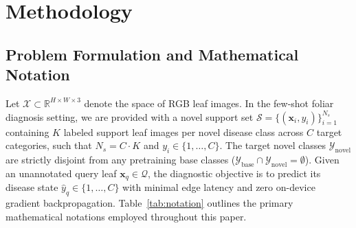 \documentclass[preprint,12pt]{elsarticle}
\begin{document}
\section{Methodology}
\label{sec:methodology}

\subsection{Problem Formulation and Mathematical Notation}
\label{sec:notation}
Let $\mathcal{X} \subset \mathbb{R}^{H \times W \times 3}$ denote the space of RGB leaf images. In the few-shot foliar diagnosis setting, we are provided with a novel support set $\mathcal{S} = \{(\mathbf{x}_i, y_i)\}_{i=1}^{N_s}$ containing $K$ labeled support leaf images per novel disease class across $C$ target categories, such that $N_s = C \cdot K$ and $y_i \in \{1, \dots, C\}$. The target novel classes $\mathcal{Y}_{\text{novel}}$ are strictly disjoint from any pretraining base classes ($\mathcal{Y}_{\text{base}} \cap \mathcal{Y}_{\text{novel}} = \emptyset$). Given an unannotated query leaf $\mathbf{x}_q \in \mathcal{Q}$, the diagnostic objective is to predict its disease state $\hat{y}_q \in \{1, \dots, C\}$ with minimal edge latency and zero on-device gradient backpropagation. Table~\ref{tab:notation} outlines the primary mathematical notations employed throughout this paper.
\end{document}
